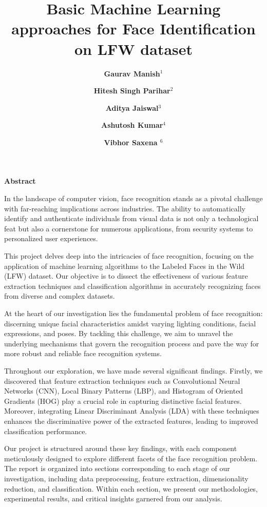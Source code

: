 \documentclass[a4paper]{article}
\title{\bfseries \huge Basic Machine Learning approaches for Face Identification on LFW dataset}
\author{\bfseries \Large Gaurav Manish$^1$\and \bfseries \Large Hitesh Singh Parihar$^2$ \and \bfseries \Large Aditya Jaiswal$^3$\and \bfseries \Large Ashutosh Kumar$^4$\and \bfseries \Large Vibhor Saxena $^6$}
\date{ \bfseries \Large
	$^1$Indian Institute Of Technology,Jodhpur \\ \textbf{\{  b22cs079 , b22ee0089 , b22cs025 , b22cs015,c23cs1005\}@iitj.ac.in}\\%
	\texttt
}
\theoremstyle{plain}
\theoremstyle{definition}
\renewenvironment{abstract}
 {\Large\textbf{Abstract}\vspace{0.5em}\par\noindent\ignorespaces}
 {\par\vspace{0.5em}}
\begin{document}
	\maketitle
	
	\begin  {abstract}
 \fontsize{15}{15}\selectfont 
 In the landscape of computer vision, face recognition stands as a pivotal challenge with far-reaching implications across industries. The ability to automatically identify and authenticate individuals from visual data is not only a technological feat but also a cornerstone for numerous applications, from security systems to personalized user experiences.\vspace{8pt}

This project delves deep into the intricacies of face recognition, focusing on the application of machine learning algorithms to the Labeled Faces in the Wild (LFW) dataset. Our objective is to dissect the effectiveness of various feature extraction techniques and classification algorithms in accurately recognizing faces from diverse and complex datasets.\vspace{8pt}

At the heart of our investigation lies the fundamental problem of face recognition: discerning unique facial characteristics amidst varying lighting conditions, facial expressions, and poses. By tackling this challenge, we aim to unravel the underlying mechanisms that govern the recognition process and pave the way for more robust and reliable face recognition systems.\vspace{8pt}

Throughout our exploration, we have made several significant findings. Firstly, we discovered that feature extraction techniques such as Convolutional Neural Networks (CNN), Local Binary Patterns (LBP), and Histogram of Oriented Gradients (HOG) play a crucial role in capturing distinctive facial features. Moreover, integrating Linear Discriminant Analysis (LDA) with these techniques enhances the discriminative power of the extracted features, leading to improved classification performance.\vspace{8pt}

Our project is structured around these key findings, with each component meticulously designed to explore different facets of the face recognition problem. The report is organized into sections corresponding to each stage of our investigation, including data preprocessing, feature extraction, dimensionality reduction, and classification. Within each section, we present our methodologies, experimental results, and critical insights garnered from our analysis.\vspace{8pt}


\end{abstract}
\end{document}
